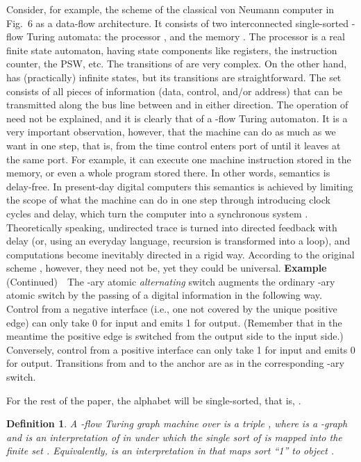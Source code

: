 \documentclass{eptcs}
\newtheorem{definition}{Definition}
\begin{document}
Consider, for
example, the scheme  of the classical von Neumann computer in Fig.~6 as a data-flow
architecture. It consists of two interconnected single-sorted -flow Turing automata: 
the processor , and the memory . The processor is a real finite state
automaton, having state components like registers, the instruction counter, the PSW, etc. 
The transitions of  are very complex. On the other hand,  has (practically) infinite states, 
but its transitions are straightforward. The set  consists of all pieces of 
information (data, control, and/or address) that can be transmitted along the bus
line between  and  in either direction. The operation of  need not be explained, 
and it is clearly that of a -flow Turing automaton. It is a very
important observation, however, that the machine can do as much as we want in one
step, that is, from the time control enters port  of  until it leaves at
the same port. For example, it can execute one machine instruction stored in the
memory, or even a whole program stored there. In other words, semantics
is delay-free. In present-day digital computers this semantics is achieved by limiting
the scope of what the machine can do in one step through introducing clock
cycles and delay, which turn the computer into a synchronous system \cite{tcs}.
Theoretically speaking, undirected trace is turned into directed feedback with
delay (or, using an everyday language, recursion is transformed into a loop),
and  computations become inevitably directed in a rigid way. According to the original
scheme , however, they need not be, yet they could be universal.
\vspp\newline
{\bf Example} (Continued)\ \ The -ary atomic {\em alternating\/} switch 
 augments 
the ordinary -ary atomic switch by the passing of a digital information in the following
way. Control from a negative interface (i.e., one not covered by the unique positive edge)
can only take 0 for input and emits 1 for output. (Remember that in the meantime the
positive edge is switched from the output side to the input side.) Conversely, control
from a positive interface can only take 1 for input and emits 0 for output. 
Transitions from and to the anchor are as in the corresponding -ary switch.

For the rest of the paper, the alphabet  will be single-sorted, that is,
.
\begin{definition} {\em A {\em -flow Turing graph machine\/} 
over  is a triple
, where  is a -graph and  is an interpretation of 
in  under which the single sort of  is mapped into the {\em finite\/} set .
Equivalently,  is an interpretation in \dil  that maps sort
``1'' to object .} 
\end{definition}
\end{document}
